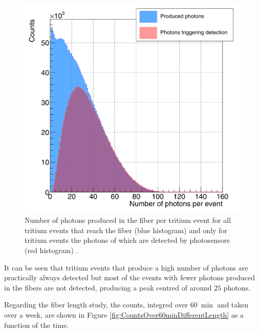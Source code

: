 \begin{figure}[h]
\centering
\includegraphics[scale=0.3]{Figures/8SimulationsResults/81TRITIUMDesign/813Length/CollectionPhotonsInFibers.png}
\caption{Number of photons produced in the fiber per tritium event for all tritium events that reach the fiber (blue histogram) and only for tritium events the photons of which are detected by photosensors (red histogram) \cite{SimulationPaperCarlos}.\label{fig:PhotonsFibersYesNoPhotosensors}}
\end{figure}

It can be seen that tritium events that produce a high number of photons are practically always detected but most of the events with fewer photons produced in the fibers are not detected, producing a peak centred of around $25$ photons.  

Regarding the fiber length study, the counts, integred over $60~\min$ and taken over a week, are shown in Figure \ref{fig:CountsOver60minDifferentLength} as a function of the time.

